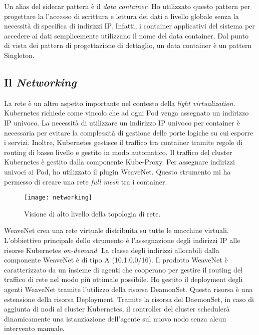 Un alias del sidecar pattern è il \textit{data container}. 
Ho utilizzato questo pattern per progettare la 
l'accesso di scrittura e lettura dei dati a livello
globale senza la necessità di specifica di indirizzi IP. 
Infatti, i container applicativi del sistema 
per accedere ai dati semplicemente 
utilizzano il nome del data container. Dal punto 
di vista dei pattern di progettazione di dettaglio,
un data container è un pattern Singleton. 


\subsection{Il \textit{Networking}}

La rete è un altro aspetto importante nel 
contesto della \textit{light virtualization}.
Kubernetes richiede come vincolo che ad ogni 
Pod venga assegnato un indirizzo IP univoco. 
La necessità di utilizzare un indirizzo IP univoco per 
container è necessaria per evitare la complessità di gestione 
delle porte logiche su cui esporre i servizi.
Inoltre, Kubernetes gestisce il traffico 
tra container tramite regole di routing di basso livello
e gestito in modo automatico. Il traffico del cluster Kubernetes 
è gestito dalla componente Kube-Proxy.
Per assegnare indirizzi univoci ai Pod, ho utilizzato
il plugin WeaveNet. 
Questo strumento mi ha permesso di creare una 
rete \textit{full mesh} tra i container.

\begin{figure}[htbp]
	\begin{center}
		\texttt{[image: networking]}
		\caption{Visione di alto livello della topologia di rete.}
	\end{center}
\end{figure}

WeaveNet crea una rete virtuale distribuita su tutte le macchine 
virtuali. L'obbiettivo principale dello strumento è l'assegnazione 
degli indirizzi IP alle risorse Kubernetes \textit{on-demand}. 
La classe degli indirizzi allocabili dalla componente WeaveNet è di tipo A 
(10.1.0.0/16).  
Il prodotto WeaveNet è caratterizzato da un insieme di agenti che cooperano
per gestire il routing del traffico di rete nel modo più ottimale possibile.
Ho gestito il deployment degli agenti WeaveNet tramite l'utilizzo 
della risorsa DeamonSet. Questa risorsa è una estensione della risorsa
Deployment. Tramite la risorsa del DaemonSet, in caso di aggiunta di nodi al 
cluster Kubernetes, il controller del cluster schedulerà dinamicamente 
una istanziazione dell'agente sul nuovo nodo
senza alcun intervento manuale.

